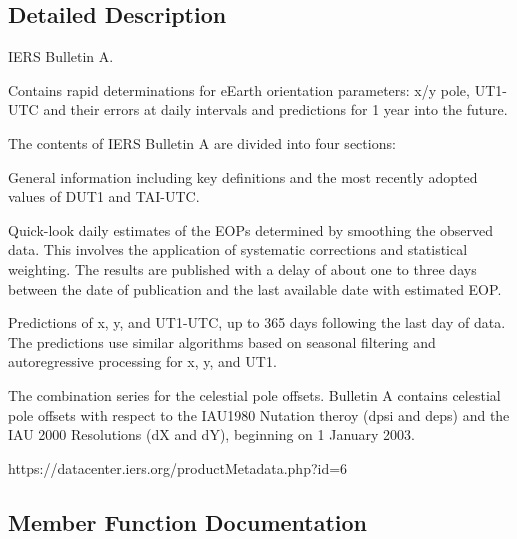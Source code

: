 \subsection{Detailed Description}
I\+E\+RS Bulletin A. 

Contains rapid determinations for e\+Earth orientation parameters\+: x/y pole, U\+T1-\/\+U\+TC and their errors at daily intervals and predictions for 1 year into the future.

The contents of I\+E\+RS Bulletin A are divided into four sections\+:


\begin{DoxyEnumerate}
\item General information including key definitions and the most recently adopted values of D\+U\+T1 and T\+A\+I-\/\+U\+TC.
\item Quick-\/look daily estimates of the E\+O\+Ps determined by smoothing the observed data. This involves the application of systematic corrections and statistical weighting. The results are published with a delay of about one to three days between the date of publication and the last available date with estimated E\+OP.
\item Predictions of x, y, and U\+T1-\/\+U\+TC, up to 365 days following the last day of data. The predictions use similar algorithms based on seasonal filtering and autoregressive processing for x, y, and U\+T1.
\item The combination series for the celestial pole offsets. Bulletin A contains celestial pole offsets with respect to the I\+A\+U1980 Nutation theroy (dpsi and deps) and the I\+AU 2000 Resolutions (dX and dY), beginning on 1 January 2003.
\end{DoxyEnumerate}

https\+://datacenter.iers.\+org/product\+Metadata.php?id=6 

\subsection{Member Function Documentation}
\mbox{\label{classostk_1_1physics_1_1coord_1_1frame_1_1provider_1_1iers_1_1_bulletin_a_aaef82b98b08ef2be421127ce3b8e2212}} 
